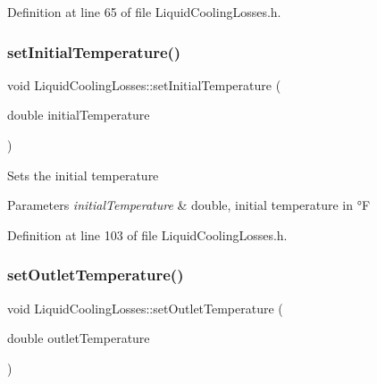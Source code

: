 Definition at line 65 of file Liquid\+Cooling\+Losses.\+h.

\mbox{\label{class_liquid_cooling_losses_aa7f7718de77a96b8e269a06a24d297d8}} 
\subsubsection{\texorpdfstring{set\+Initial\+Temperature()}{setInitialTemperature()}}
{\footnotesize\ttfamily void Liquid\+Cooling\+Losses\+::set\+Initial\+Temperature (\begin{DoxyParamCaption}\item[{double}]{initial\+Temperature }\end{DoxyParamCaption})\hspace{0.3cm}{\ttfamily [inline]}}

Sets the initial temperature


\begin{DoxyParams}{Parameters}
{\em initial\+Temperature} & double, initial temperature in °F \\
\hline
\end{DoxyParams}


Definition at line 103 of file Liquid\+Cooling\+Losses.\+h.

\mbox{\label{class_liquid_cooling_losses_ab8ea8e748853e18fa480afa0b3e417ee}} 
\subsubsection{\texorpdfstring{set\+Outlet\+Temperature()}{setOutletTemperature()}}
{\footnotesize\ttfamily void Liquid\+Cooling\+Losses\+::set\+Outlet\+Temperature (\begin{DoxyParamCaption}\item[{double}]{outlet\+Temperature }\end{DoxyParamCaption})\hspace{0.3cm}{\ttfamily [inline]}}

